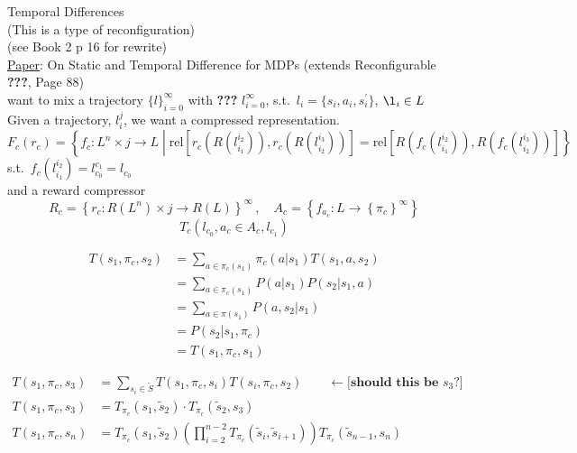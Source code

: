 Temporal Differences\\
(This is a type of reconfiguration)\\

(see Book 2 p 16 for rewrite)\\

\underline{Paper}: On Static and Temporal Difference for MDPs (extends Reconfigurable \textbf{???}, Page 88)\\

want to mix a trajectory $\{ l \}_{i=0}^{\infty}$ with \textbf{???} $l_{i=0}^{\infty}$, s.t.\ $l_i=\{ s_i, a_i, s^\prime_i \}$, $\l_i \in L$ \\

Given a trajectory, $l_i^j$, we want a compressed representation.\\

\begin{equation*}
F_c ( r_c ) = \left\{ 
f_c: L^n \times j \to L
\middle| 
\textrm{rel}\left[ r_c\left( R(  l_{i_1}^{i_2} ) \right), r_c\left( R( l_{i_2}^{i_3} ) \right) \right]
=
\textrm{rel}\left[ R\left( f_c( l_{i_1}^{i_2} ) \right), R\left( f_c( l_{i_2}^{i_3} ) \right) \right]
\right\}
\end{equation*}
s.t.\ $f_c( l_{i_1}^{i_2} ) = l_{c_0}^{c_1}=l_{c_0}$\\

and a reward compressor
\begin{equation*}
R_c = \left\{ r_c: R(L^n)\times j \to R(L)\right\}^{\infty}\,,\quad A_c= \left\{ f_{a_c}: L \to \left\{ \pi_c \right\}^{\infty} \right\}
\end{equation*}
\begin{equation*}
T_c(l_{c_0}, a_c \in A_c, l_{c_1})
\end{equation*}

\begin{align*}
T( s_1, \pi_c, s_2 ) & = \sum_{a \in \pi_c( s_1 )} \pi_c( a|s_1 ) T( s_1, a, s_2 ) \\
 & = \sum_{a \in \pi_c( s_1 )} P( a|s_1 ) P( s_2|s_1, a ) \\
 & = \sum_{a \in \pi(s_1)} P( a, s_2|s_1 ) \\
 & = P( s_2|s_1, \pi_c ) \\
 & = T( s_1, \pi_c, s_1 )
\end{align*}

\begin{align*}
T( s_1, \pi_c, s_3 ) & = \sum_{s_i \in \tilde{S}} T(s_1, \pi_c, s_i) T( s_i, \pi_c, s_2)  \qquad \longleftarrow\textbf{[should\  this\  be\ }s_3\textbf{?]} \\
T( s_1, \pi_c, s_3 ) & = T_{\pi_c}( s_1, \tilde{s}_2 ) \cdot T_{\pi_c}( \tilde{s}_2, s_3 ) \\
T( s_1, \pi_c, s_n ) & = T_{\pi_c}( s_1, \tilde{s}_2 ) \left( \prod_{i=2}^{n-2} T_{\pi_c}( \tilde{s}_i, \tilde{s}_{i+1} )\right) T_{\pi_c}(\tilde{s}_{n-1}, s_n )
\end{align*}

